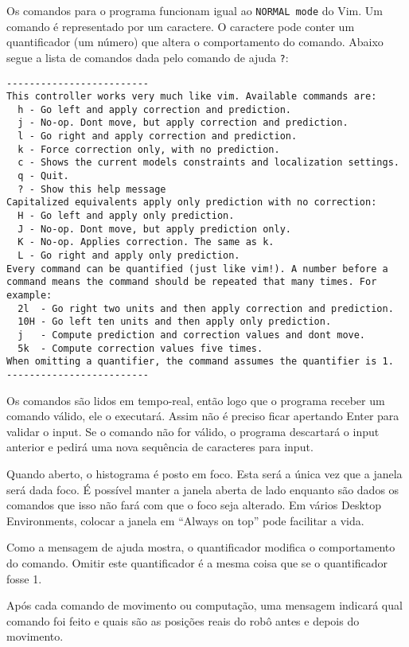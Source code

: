 \documentclass[12pt]{article}
\theoremstyle{plain}
\numberwithin{equation}{section}
\newcommand{\code}[1]{\lstinline[mathescape=true]{#1}}
\begin{document}
Os comandos para o programa funcionam igual ao \texttt{NORMAL mode} do Vim. Um comando é
representado por um caractere. O caractere pode conter um quantificador (um número) que altera o
comportamento do comando. Abaixo segue a lista de comandos dada pelo comando de ajuda \code{?}:\\

\begin{lstlisting}
-------------------------
This controller works very much like vim. Available commands are:
  h - Go left and apply correction and prediction.
  j - No-op. Dont move, but apply correction and prediction.
  l - Go right and apply correction and prediction.
  k - Force correction only, with no prediction.
  c - Shows the current models constraints and localization settings.
  q - Quit.
  ? - Show this help message
Capitalized equivalents apply only prediction with no correction:
  H - Go left and apply only prediction.
  J - No-op. Dont move, but apply prediction only.
  K - No-op. Applies correction. The same as k.
  L - Go right and apply only prediction.
Every command can be quantified (just like vim!). A number before a command means the command should be repeated that many times. For example:
  2l  - Go right two units and then apply correction and prediction.
  10H - Go left ten units and then apply only prediction.
  j   - Compute prediction and correction values and dont move.
  5k  - Compute correction values five times.
When omitting a quantifier, the command assumes the quantifier is 1.
-------------------------
\end{lstlisting}

Os comandos são lidos em tempo-real, então logo que o programa receber um comando válido, ele o
executará. Assim não é preciso ficar apertando Enter para validar o input. Se o comando não for
válido, o programa descartará o input anterior e pedirá uma nova sequência de caracteres para
input.

Quando aberto, o histograma é posto em foco. Esta será a única vez que a janela será dada
foco. É possível manter a janela aberta de lado enquanto são dados os comandos que isso não fará
com que o foco seja alterado. Em vários Desktop Environments, colocar a janela em ``Always on top''
pode facilitar a vida.

Como a mensagem de ajuda mostra, o quantificador modifica o comportamento do comando. Omitir este
quantificador é a mesma coisa que se o quantificador fosse 1.

Após cada comando de movimento ou computação, uma mensagem indicará qual comando foi feito e quais
são as posições reais do robô antes e depois do movimento.
\end{document}
